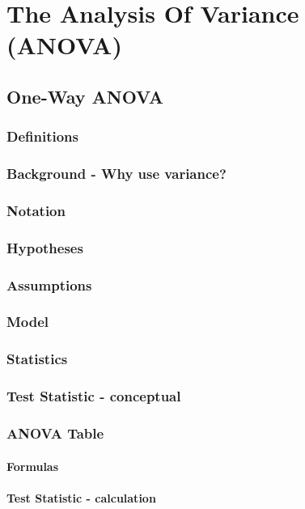 \chapter{The Analysis Of Variance (ANOVA)}  %

\section{One-Way ANOVA}  %
\subsection{Definitions}  %
\subsection{Background - Why use variance?}  %
\subsection{Notation}  %
\subsection{Hypotheses}  %
\subsection{Assumptions}  %
\subsection{Model}  %
\subsection{Statistics}  %
\subsection{Test Statistic - conceptual}  %
\subsection{ANOVA Table}  %
\subsubsection{Formulas}  %
\subsubsection{Test Statistic - calculation}  %

